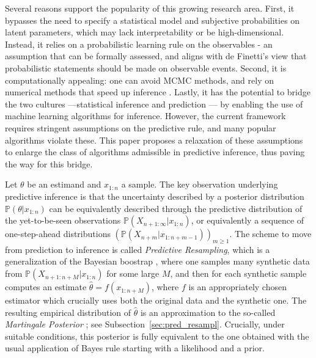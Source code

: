 \documentclass{article}
\theoremstyle{definition}
\renewcommand{\&}{and}
\begin{document}
Several reasons support the popularity of this growing research area. First, it bypasses the need to specify a statistical model and subjective probabilities on latent parameters, which may lack interpretability or be high-dimensional. Instead, it relies on a probabilistic learning rule on the observables - an assumption that can be formally assessed, and %
aligns with de Finetti's view that probabilistic statements should be made on observable events. %
Second, it is computationally appealing: one can avoid MCMC methods, and rely on numerical methods that speed up inference \citep{fong2021martingale,fortini2020quasi}. %
Lastly, it has the potential to bridge the two cultures —statistical inference and prediction \citep{breiman2001statistical} — by enabling the use of machine learning algorithms for inference. However, the current framework requires stringent assumptions on the predictive rule, and many popular algorithms violate these. This paper proposes a relaxation of these assumptions to enlarge the class of algorithms admissible in predictive inference, thus paving the way for this bridge. 


Let $\theta$ be an estimand and $x_{1:n}$ a sample. The key observation underlying predictive inference is that the uncertainty described by a posterior distribution $\mathbb{P}(\theta|x_{1:n})$ %
can be equivalently described through the predictive distribution of the yet-to-be-seen observations $\mathbb{P}(X_{n+1:\infty}|x_{1:n})$, or equivalently a sequence of one-step-ahead distributions $(\mathbb{P}(X_{n+m}|x_{1:n+m-1}))_{m \geq 1}$. The scheme to move from prediction to inference is called \textit{Predictive Resampling}, which is a generalization of the Bayesian boostrap \citep{rubin1981bayesian}, where one samples many synthetic data from $\mathbb{P}(X_{n+1:n+M}|x_{1:n})$ for some large $M$, and then for each synthetic sample computes an estimate $\hat{\theta}=f(x_{1:n+M})$, where $f$ is an appropriately chosen estimator which crucially uses both the original data and the synthetic one. The resulting empirical distribution of $\hat{\theta}$ is an approximation to the so-called \textit{Martingale Posterior} \citep{fong2021martingale}; see Subsection~\ref{sec:pred_resampl}. Crucially, under suitable conditions, this posterior is fully equivalent to the one obtained with the usual application of Bayes rule  starting with a likelihood and a prior. %
\end{document}
